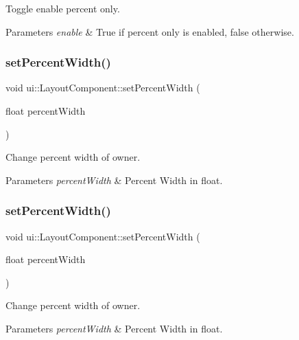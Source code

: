 Toggle enable percent only. 
\begin{DoxyParams}{Parameters}
{\em enable} & True if percent only is enabled, false otherwise. \\
\hline
\end{DoxyParams}
\mbox{\label{classui_1_1LayoutComponent_a0cd30388085811c19d4939062e8643a5}} 
\subsubsection{\texorpdfstring{set\+Percent\+Width()}{setPercentWidth()}\hspace{0.1cm}{\footnotesize\ttfamily [1/2]}}
{\footnotesize\ttfamily void ui\+::\+Layout\+Component\+::set\+Percent\+Width (\begin{DoxyParamCaption}\item[{float}]{percent\+Width }\end{DoxyParamCaption})}

Change percent width of owner. 
\begin{DoxyParams}{Parameters}
{\em percent\+Width} & Percent Width in float. \\
\hline
\end{DoxyParams}
\mbox{\label{classui_1_1LayoutComponent_a0cd30388085811c19d4939062e8643a5}} 
\subsubsection{\texorpdfstring{set\+Percent\+Width()}{setPercentWidth()}\hspace{0.1cm}{\footnotesize\ttfamily [2/2]}}
{\footnotesize\ttfamily void ui\+::\+Layout\+Component\+::set\+Percent\+Width (\begin{DoxyParamCaption}\item[{float}]{percent\+Width }\end{DoxyParamCaption})}

Change percent width of owner. 
\begin{DoxyParams}{Parameters}
{\em percent\+Width} & Percent Width in float. \\
\hline
\end{DoxyParams}
\mbox{\label{classui_1_1LayoutComponent_a225d5d4a20568a3a4a4b2f53732bdab4}} 
